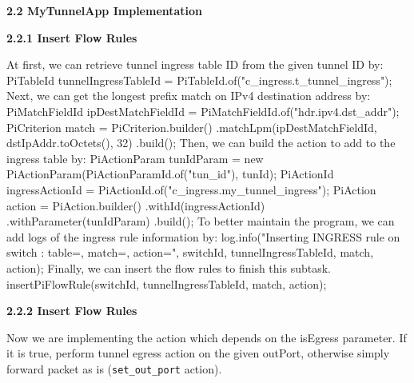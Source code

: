 \documentclass{article}%
\newenvironment{code}%
   {\snugshade\verbatim}%
   {\endverbatim\endsnugshade}
\begin{document}
\begin{Large}
\begin{flushleft}
\begin{LARGE}
\textbf{2.2 MyTunnelApp Implementation} 
\end{LARGE}
\end{flushleft}
\begin{flushleft}
\begin{Large}
\textbf{2.2.1 Insert Flow Rules} 
\end{Large}
\end{flushleft}
At first, we can retrieve tunnel ingress table ID from the given tunnel ID by:
\begin{code}
    PiTableId tunnelIngressTableId = 
        PiTableId.of("c_ingress.t_tunnel_ingress");
\end{code}
Next, we can get the longest prefix match on IPv4 destination address by:
\begin{code}
    PiMatchFieldId ipDestMatchFieldId = 
        PiMatchFieldId.of("hdr.ipv4.dst_addr");
    PiCriterion match = PiCriterion.builder()
            .matchLpm(ipDestMatchFieldId, dstIpAddr.toOctets(), 32)
            .build();
\end{code}
Then, we can build the action to add to the ingress table by:
\begin{code}
    PiActionParam tunIdParam = 
        new PiActionParam(PiActionParamId.of("tun_id"), tunId);
    PiActionId ingressActionId = 
        PiActionId.of("c_ingress.my_tunnel_ingress");
    PiAction action = PiAction.builder()
            .withId(ingressActionId)
            .withParameter(tunIdParam)
            .build();
\end{code}
To better maintain the program, we can add logs of the ingress rule information by:
\begin{code}
    log.info("Inserting INGRESS rule on switch {}: 
        table={}, match={}, action={}",
        switchId, tunnelIngressTableId, match, action);
\end{code}
Finally, we can insert the flow rules to finish this subtask.
\begin{code}
    insertPiFlowRule(switchId, tunnelIngressTableId, match, action);
\end{code}

\newpage
\begin{flushleft}
\begin{Large}
\textbf{2.2.2 Insert Flow Rules} 
\end{Large}
\end{flushleft}
Now we are implementing the action which depends on the isEgress parameter. If it is true, perform tunnel egress action on the given outPort, otherwise simply forward packet as is (\texttt{set\_out\_port} action).


\end{Large}
\end{document}
